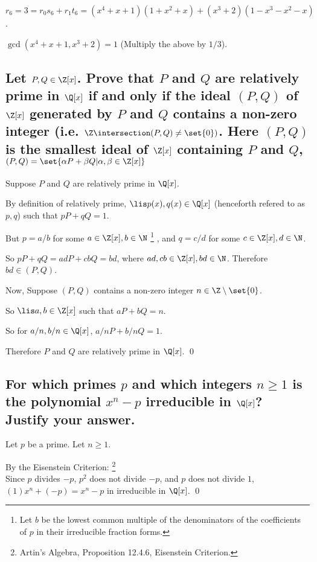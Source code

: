         $r_6 = 3 = r_0s_6 + r_1t_6 = (x^4+x+1)(1+x^2+x) + (x^3+2)(1-x^3-x^2-x)$.

        $\gcd(x^4+x+1, x^3 + 2) = 1$ (Multiply the above by $1/3$).

    \subsection[(ii)]{Let $P,Q \in \Z[x]$. Prove that $P$ and $Q$ are relatively prime in $\Q[x]$
        if and only if the ideal $(P,Q)$ of $\Z[x]$ generated by $P$ and $Q$ contains a non-zero integer
        (i.e. $\Z \intersection (P,Q) \neq \set{0})$. Here $(P,Q)$ is the smallest ideal of $\Z[x]$
        containing $P$ and $Q$, $(P,Q) = \set{\alpha P + \beta Q | \alpha, \beta \in \Z[x]}$
    }
        Suppose $P$ and $Q$ are relatively prime in $\Q[x]$.

        By definition of relatively prime, $\lis p(x), q(x) \in \Q[x]$ (henceforth refered to as $p,q$)
        such that $pP + qQ = 1$.

        But $p = a/b$ for some $a \in \Z[x], b \in \N$
        \footnote{Let $b$ be the lowest common multiple of the denominators of the coefficients of
            $p$ in their irreducible fraction forms.}
        ,
        and $q = c/d$ for some $c \in \Z[x], d \in \N$.

        So $pP + qQ = adP + cbQ = bd$, where $ad, cb \in \Z[x], bd \in \N$.
        Therefore $bd \in (P,Q)$.

        Now, Suppose $(P,Q)$ contains a non-zero integer $n \in \Z \setminus\set{0}$.

        So $\lis a,b \in \Z[x]$ such that $aP + bQ = n$.

        So for $a/n, b/n \in \Q[x]$, $a/n P + b/n Q = 1$.

        Therefore $P$ and $Q$ are relatively prime in $\Q[x]$.
        \qed

    \subsection[(iii)]{For which primes $p$ and which integers $n\geq 1$ is the polynomial 
        $x^n - p$ irreducible in $\Q[x]$? Justify your answer.}

        Let $p$ be a prime. Let $n \geq 1$.

        By the Eisenstein Criterion: 
        \footnote{Artin's Algebra, Proposition 12.4.6, Eisenstein Criterion.}
        \\
        Since $p$ divides $-p$, $p^2$ does not divide $-p$, and $p$ does not divide $1$,
        $(1)x^n + (-p) = x^n - p$ in irreducible in $\Q[x]$.
        \qed